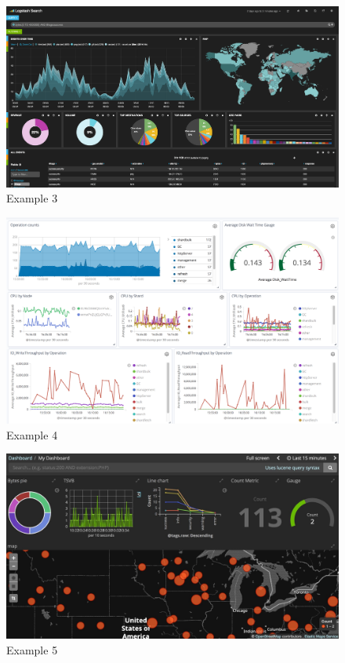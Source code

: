 \documentclass[]{report}
\begin{document}
\begin{figure}[ht]
    \includegraphics[width =\columnwidth]{dashboard_example3.png}
    \caption{Example 3}
    \label{fig:EX3}
\end{figure}
\begin{figure}[ht]
    \includegraphics[width =\columnwidth]{dashboard_example4.png}
    \caption{Example 4}
    \label{fig:EX4}
\end{figure}
\begin{figure}[ht]
    \includegraphics[width =\columnwidth]{dashboard_example5.png}
    \caption{Example 5}
    \label{fig:EX5}
\end{figure}
\end{document}

